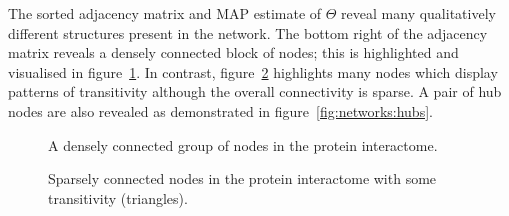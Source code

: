 The sorted adjacency matrix and MAP estimate of $\Theta$ reveal many qualitatively different structures present in the network.
The bottom right of the adjacency matrix reveals a densely connected block of nodes; this is highlighted and visualised in figure~\ref{fig:networks:block}.
In contrast, figure~\ref{fig:networks:sparse} highlights many nodes which display patterns of transitivity although the overall connectivity is sparse.
A pair of hub nodes are also revealed as demonstrated in figure~\ref{fig:networks:hubs}.

\begin{figure}[ht]
  \centering
{}
  \caption{A densely connected group of nodes in the protein interactome.}
  \label{fig:networks:block}
\end{figure}

\begin{figure}[ht]
  \centering
{}
  \caption[Sparsely connected nodes in the protein interactome.]{Sparsely connected nodes in the protein interactome with some transitivity (triangles).}
  \label{fig:networks:sparse}
\end{figure}

